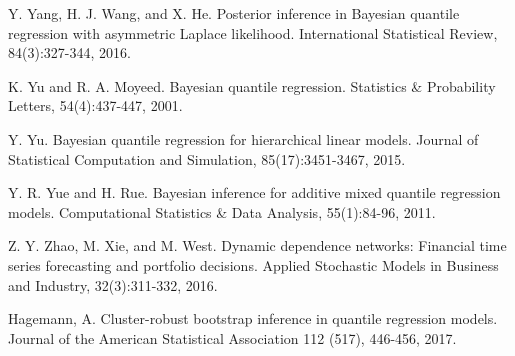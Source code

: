 \documentclass[12pt,a4paper]{article}\usepackage[]{graphicx}\usepackage[]{color}\usepackage{subfigure}
\begin{document}
\begin{thebibliography}{HHH11}
Y. Yang, H. J. Wang, and X. He. Posterior inference in Bayesian quantile
regression with asymmetric Laplace likelihood. International Statistical
Review, 84(3):327-344, 2016.

K. Yu and R. A. Moyeed. Bayesian quantile regression. Statistics \&
Probability Letters, 54(4):437-447, 2001.

Y. Yu. Bayesian quantile regression for hierarchical linear models. Journal
of Statistical Computation and Simulation, 85(17):3451-3467, 2015.

Y. R. Yue and H. Rue. Bayesian inference for additive mixed quantile
regression models. Computational Statistics \& Data Analysis, 55(1):84-96, 2011.

Z. Y. Zhao, M. Xie, and M. West. Dynamic dependence networks: Financial
time series forecasting and portfolio decisions. Applied Stochastic Models
in Business and Industry, 32(3):311-332, 2016.

 Hagemann, A. Cluster-robust bootstrap inference in quantile regression
models. Journal of the American Statistical Association 112 (517), 446-456, 2017.

\end{thebibliography}
\end{document}

